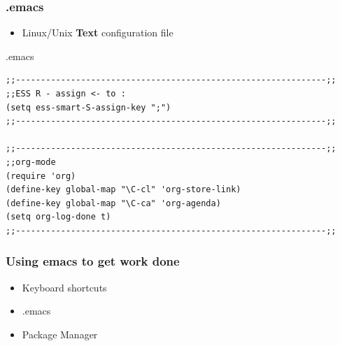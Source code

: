 \documentclass[t,10pt]{beamer}
\begin{document}
\begin{frame}[fragile]
\frametitle{.emacs}
\label{sec-2-6}

\begin{itemize}
\item Linux/Unix \textbf{Text} configuration file
\end{itemize}
\vspace{0.25}
\begin{exampleblock}{.emacs}
\label{sec-2-6-1}


\begin{verbatim}
;;--------------------------------------------------------------;;
;;ESS R - assign <- to :
(setq ess-smart-S-assign-key ";") 
;;--------------------------------------------------------------;;

;;--------------------------------------------------------------;;
;;org-mode
(require 'org)
(define-key global-map "\C-cl" 'org-store-link)
(define-key global-map "\C-ca" 'org-agenda)
(setq org-log-done t)
;;--------------------------------------------------------------;;
\end{verbatim}
    
\end{exampleblock}
\end{frame}
\begin{frame}
\frametitle{Using emacs to get work done}
\label{sec-2-7}

\begin{itemize}
\item Keyboard shortcuts
\end{itemize}
\vspace{0.25in}
\begin{itemize}
\item .emacs
\end{itemize}
\vspace{0.25in}
\begin{itemize}
\item Package Manager
\end{itemize}
\end{frame}
\end{document}
